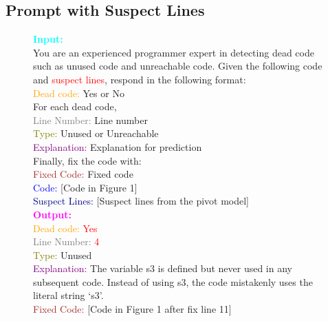 \documentclass[11pt]{article}
\begin{document}
\subsection{Prompt with Suspect Lines}
\begin{figure}[ht]
\begin{minipage}{\linewidth}
\small
\noindent\makebox[\linewidth]{\rule{\linewidth}{1pt}}
\colorbox{codebg}{
\parbox{\dimexpr\linewidth-2\fboxsep}{
\textbf{\textcolor{cyan}{Input:}} \\
You are an experienced programmer expert in detecting dead code such as unused code and unreachable code. Given the following code and \textcolor{red}{suspect lines}, respond in the following format: \\
\textcolor{orange}{Dead code:} Yes or No \\
For each dead code,\\
\textcolor{gray}{Line Number:} Line number\\
\textcolor{olive}{Type:} Unused or Unreachable\\
\textcolor{purple}{Explanation:} Explanation for prediction\\

Finally, fix the code with: \\
\textcolor{brown}{Fixed Code:} Fixed code \\

\textcolor{blue}{Code:} [Code in Figure 1] \\
\textcolor{darkblue}{Suspect Lines:} [Suspect lines from the pivot model] \\


\textbf{\textcolor{magenta}{Output:}} \\
\textcolor{orange}{Dead code:} \textcolor{red}{Yes} \\
\textcolor{gray}{Line Number:} \textcolor{red}{4} \\
\textcolor{olive}{Type:} Unused \\
\textcolor{purple}{Explanation:} The variable s3 is defined but never used in any subsequent code. Instead of using s3, the code mistakenly uses the literal string `s3'. \\

\textcolor{brown}{Fixed Code:} [Code in Figure 1 after fix line 11]
}}
\noindent\makebox[\linewidth]{\rule{\linewidth}{1.5pt}}
\end{minipage}
\end{figure}
\end{document}
